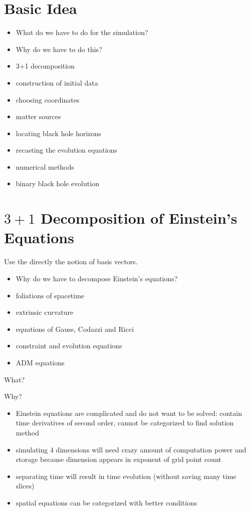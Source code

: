 \documentclass[twocolumn]{article}
\begin{document}
  \section{Basic Idea} %
  \label{sec:basic_idea}
    \begin{itemize}
      \item What do we have to do for the simulation?
      \item Why do we have to do this?
    \end{itemize}
    \begin{itemize}
      \item 3+1 decomposition
      \item construction of initial data
      \item choosing coordinates
      \item matter sources
      \item locating black hole horizons
      \item recasting the evolution equations
      \item numerical methods
      \item binary black hole evolution
    \end{itemize}

  \section{$3+1$ Decomposition of Einstein's Equations} %
    Use the directly the notion of basis vectors.

    \begin{itemize}
      \item Why do we have to decompose Einstein's equations?
      \item foliations of spacetime
      \item extrinsic curvature
      \item equations of Gauss, Codazzi and Ricci
      \item constraint and evolution equations
      \item ADM equations
    \end{itemize}

    What?

    Why?
    \begin{itemize}
      \item Einstein equations are complicated and do not want to be solved: contain time derivatives of second order, cannot be categorized to find solution method
      \item simulating 4 dimensions will need crazy amount of computation power and storage because dimension appears in exponent of grid point count
      \item separating time will result in time evolution (without saving many time slices)
      \item spatial equations can be categorized with better conditions
    \end{itemize}
\end{document}
